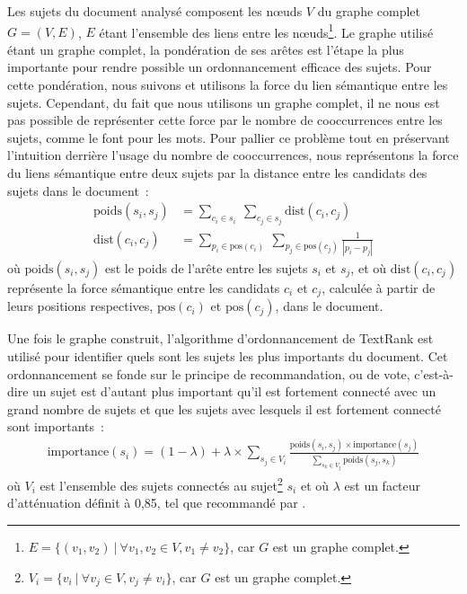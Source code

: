     Les sujets du document analysé composent les n\oe{}uds $V$ du graphe complet
    $G = (V, E)$, $E$ étant l'ensemble des liens entre les
    n\oe{}uds\footnote{$E = \{(v_1, v_2)\ |\ \forall{v_1, v_2 \in V}, v_1 \neq v_2\}$,
    car $G$ est un graphe complet.}. Le graphe utilisé étant un graphe complet,
    la pondération de ses arêtes est l'étape la plus importante pour rendre
    possible un ordonnancement efficace des sujets. Pour cette pondération, nous
    suivons  et utilisons la force du lien sémantique
    entre les sujets. Cependant, du fait que nous utilisons un graphe complet,
    il ne nous est pas possible de représenter cette force par le nombre de
    cooccurrences entre les sujets, comme le font 
    pour les mots. Pour pallier ce problème tout en préservant l'intuition
    derrière l'usage du nombre de cooccurrences, nous représentons la force du
    liens sémantique entre deux sujets par la distance entre les candidats des
    sujets dans le document~:
    \begin{align}
      \text{poids}(s_i, s_j) &= \sum_{c_i \in s_i}\ \sum_{c_j \in s_j} \text{dist}(c_i, c_j) \label{math:ponderation}\\
      \text{dist}(c_i, c_j) &= \sum_{p_i \in \text{pos}(c_i)}\ \sum_{p_j \in \text{pos}(c_j)} \frac{1}{|p_i - p_j|} \label{math:distance}
    \end{align}
    où $\text{poids}(s_i, s_j)$ est le poids de l'arête entre les sujets $s_i$
    et $s_j$, et où $\text{dist}(c_i, c_j)$ représente la force sémantique entre
    les candidats $c_i$ et $c_j$, calculée à partir de leurs positions
    respectives, $\text{pos}(c_i)$ et $\text{pos}(c_j)$, dans le document.

    Une fois le graphe construit, l'algorithme d'ordonnancement de TextRank est
    utilisé pour identifier quels sont les sujets les plus importants du
    document. Cet ordonnancement se fonde sur le principe de recommandation,
    ou de vote, c'est-à-dire un sujet est d'autant plus important qu'il est
    fortement connecté avec un grand nombre de sujets et que les sujets avec
    lesquels il est fortement connecté sont importants~:
    \begin{align}
      \text{importance}(s_i) = (1 - \lambda) + \lambda \times \sum_{s_j \in V_i} \frac{\text{poids}(s_i, s_j) \times \text{importance}(s_j)}{\sum_{s_k \in V_j} \text{poids}(s_j, s_k)} \label{math:textrank}
    \end{align}
    où $V_i$ est l'ensemble des sujets connectés au
    sujet\footnote{$V_i = \{v_i\ |\ \forall{v_j \in V}, v_j \neq v_i\}$, car $G$
    est un graphe complet.} $s_i$ et où $\lambda$ est un facteur d'atténuation
    définit à 0,85, tel que recommandé par .

